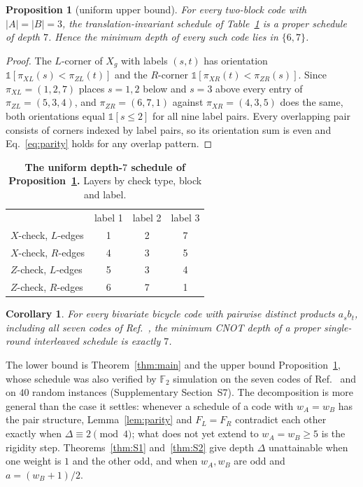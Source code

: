 \documentclass[reprint,twocolumn,superscriptaddress,nofootinbib]{revtex4-2}
\theoremstyle{plain}
\newtheorem{proposition}[theorem]{Proposition}
\newtheorem{corollary}[theorem]{Corollary}
\newcommand{\F}{\mathbb{F}_2}
\newcommand{\wA}{w_A}                  %
\newcommand{\wB}{w_B}
\begin{document}
\begin{proposition}[uniform upper bound]
\label{prop:seven}
For every two-block code with $|A|=|B|=3$, the translation-invariant
schedule of Table~\ref{tab:depth7main} is a proper schedule of depth $7$.
Hence the minimum depth of every such code lies in $\{6,7\}$.
\end{proposition}

\begin{proof}
The $L$-corner of $X_g$ with labels $(s,t)$ has orientation
$\mathbb{1}[\pi_{XL}(s)<\pi_{ZL}(t)]$ and the $R$-corner
$\mathbb{1}[\pi_{XR}(t)<\pi_{ZR}(s)]$. Since $\pi_{XL}=(1,2,7)$ places
$s=1,2$ below and $s=3$ above every entry of $\pi_{ZL}=(5,3,4)$, and
$\pi_{ZR}=(6,7,1)$ against $\pi_{XR}=(4,3,5)$ does the same, both
orientations equal $\mathbb{1}[s\le2]$ for all nine label pairs. Every
overlapping pair consists of corners indexed by label pairs, so its
orientation sum is even and Eq.~\eqref{eq:parity} holds for any overlap
pattern.
\end{proof}

\begin{table}[t]
\caption{\textbf{The uniform depth-$7$ schedule of
Proposition~\ref{prop:seven}.} Layers by check type, block and label.}
\label{tab:depth7main}
\begin{ruledtabular}
\begin{tabular}{lccc}
 & label 1 & label 2 & label 3 \\
\colrule
$X$-check, $L$-edges & 1 & 2 & 7 \\
$X$-check, $R$-edges & 4 & 3 & 5 \\
$Z$-check, $L$-edges & 5 & 3 & 4 \\
$Z$-check, $R$-edges & 6 & 7 & 1 \\
\end{tabular}
\end{ruledtabular}
\end{table}

\begin{corollary}
\label{cor:bb}
For every bivariate bicycle code with pairwise distinct products $a_sb_t$,
including all seven codes of Ref.~\cite{Bravyi2024}, the minimum CNOT
depth of a proper single-round interleaved schedule is exactly $7$.
\end{corollary}

The lower bound is Theorem~\ref{thm:main} and the upper bound
Proposition~\ref{prop:seven}, whose schedule was also verified by $\F$
simulation on the seven codes of Ref.~\cite{Bravyi2024} and on $40$ random
instances (Supplementary Section~S7). The decomposition is more general
than the case it settles: whenever a schedule of a code with $\wA=\wB$ has
the pair structure, Lemma~\ref{lem:parity} and $F_L=F_R$ contradict each
other exactly when $\Delta\equiv2\pmod 4$; what does not yet extend to
$\wA=\wB\ge5$ is the rigidity step. Theorems~\ref{thm:S1} and~\ref{thm:S2}
give depth $\Delta$ unattainable when one weight is $1$ and the other odd,
and when $\wA,\wB$ are odd and $a=(\wB+1)/2$.
\end{document}
